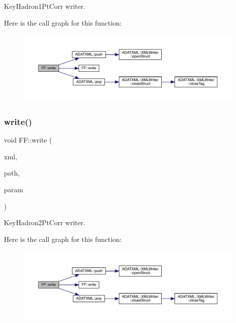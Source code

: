 Key\+Hadron1\+Pt\+Corr writer. 

Here is the call graph for this function\+:
\nopagebreak
\begin{figure}[H]
\begin{center}
\leavevmode
\includegraphics[width=350pt]{d5/da6/namespaceFF_a831b58b450a964b114e0fce65fc4de99_cgraph}
\end{center}
\end{figure}
\mbox{\label{namespaceFF_ae24f1269c1aa6329a00ea570a38546e6}} 
\subsubsection{\texorpdfstring{write()}{write()}\hspace{0.1cm}{\footnotesize\ttfamily [6/13]}}
{\footnotesize\ttfamily void F\+F\+::write (\begin{DoxyParamCaption}\item[{X\+M\+L\+Writer \&}]{xml,  }\item[{const std\+::string \&}]{path,  }\item[{const \mbox{\hyperlink{structFF_1_1KeyHadron2PtCorr__t}{Key\+Hadron2\+Pt\+Corr\+\_\+t}} \&}]{param }\end{DoxyParamCaption})}



Key\+Hadron2\+Pt\+Corr writer. 

Here is the call graph for this function\+:
\nopagebreak
\begin{figure}[H]
\begin{center}
\leavevmode
\includegraphics[width=350pt]{d5/da6/namespaceFF_ae24f1269c1aa6329a00ea570a38546e6_cgraph}
\end{center}
\end{figure}
\mbox{\label{namespaceFF_a0c22ea2c009e3006aa0f745b9a3e2cc2}} 
